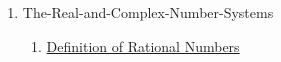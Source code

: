 \clearpage
\renewcommand{\notetitle}{Table of Contents}
\label{toc}
\begin{enumerate}

\item The-Real-and-Complex-Number-Systems
\begin{enumerate}
\item \hyperref[202501131947]{Definition of Rational Numbers}
\end{enumerate}
\end{enumerate}

\newpage
